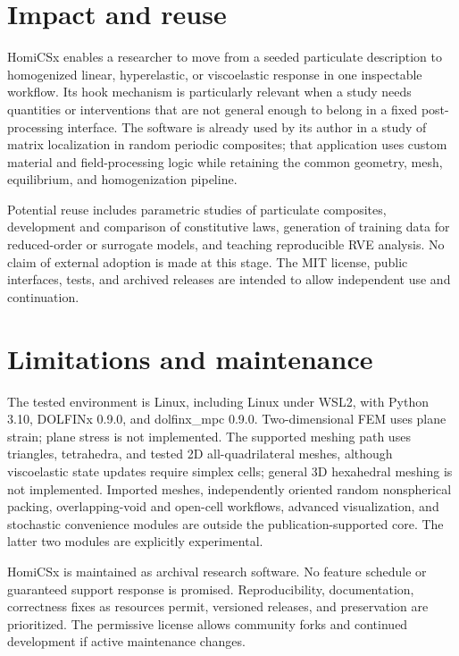 \documentclass[preprint,12pt]{elsarticle}
\begin{document}
\section{Impact and reuse}

HomiCSx enables a researcher to move from a seeded particulate description to
homogenized linear, hyperelastic, or viscoelastic response in one inspectable
workflow. Its hook mechanism is particularly relevant when a study needs
quantities or interventions that are not general enough to belong in a fixed
post-processing interface. The software is already used by its author in a
study of matrix localization in random periodic composites; that application
uses custom material and field-processing logic while retaining the common
geometry, mesh, equilibrium, and homogenization pipeline.

Potential reuse includes parametric studies of particulate composites,
development and comparison of constitutive laws, generation of training data
for reduced-order or surrogate models, and teaching reproducible RVE analysis.
No claim of external adoption is made at this stage. The MIT license, public
interfaces, tests, and archived releases are intended to allow independent use
and continuation.

\section{Limitations and maintenance}

The tested environment is Linux, including Linux under WSL2, with Python 3.10,
DOLFINx 0.9.0, and dolfinx\_mpc 0.9.0. Two-dimensional FEM uses plane strain;
plane stress is not implemented. The supported meshing path uses triangles,
tetrahedra, and tested 2D all-quadrilateral meshes, although viscoelastic state
updates require simplex cells; general 3D hexahedral meshing is not
implemented. Imported meshes, independently oriented random
nonspherical packing, overlapping-void and open-cell workflows,
advanced visualization, and stochastic convenience modules are outside the
publication-supported core. The latter two modules are explicitly
experimental.

HomiCSx is maintained as archival research software. No feature schedule or
guaranteed support response is promised. Reproducibility, documentation,
correctness fixes as resources permit, versioned releases, and preservation
are prioritized. The permissive license allows community forks and continued
development if active maintenance changes.
\end{document}
